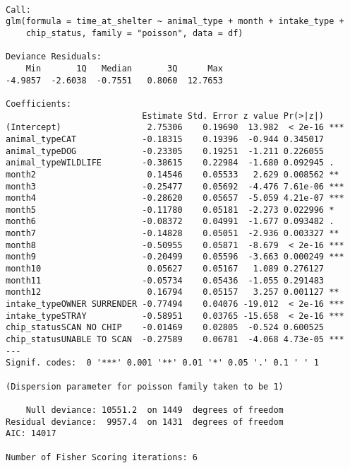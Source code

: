 \documentclass[
]{article}
\begin{document}
\begin{verbatim}

Call:
glm(formula = time_at_shelter ~ animal_type + month + intake_type + 
    chip_status, family = "poisson", data = df)

Deviance Residuals: 
    Min       1Q   Median       3Q      Max  
-4.9857  -2.6038  -0.7551   0.8060  12.7653  

Coefficients:
                           Estimate Std. Error z value Pr(>|z|)    
(Intercept)                 2.75306    0.19690  13.982  < 2e-16 ***
animal_typeCAT             -0.18315    0.19396  -0.944 0.345017    
animal_typeDOG             -0.23305    0.19251  -1.211 0.226055    
animal_typeWILDLIFE        -0.38615    0.22984  -1.680 0.092945 .  
month2                      0.14546    0.05533   2.629 0.008562 ** 
month3                     -0.25477    0.05692  -4.476 7.61e-06 ***
month4                     -0.28620    0.05657  -5.059 4.21e-07 ***
month5                     -0.11780    0.05181  -2.273 0.022996 *  
month6                     -0.08372    0.04991  -1.677 0.093482 .  
month7                     -0.14828    0.05051  -2.936 0.003327 ** 
month8                     -0.50955    0.05871  -8.679  < 2e-16 ***
month9                     -0.20499    0.05596  -3.663 0.000249 ***
month10                     0.05627    0.05167   1.089 0.276127    
month11                    -0.05734    0.05436  -1.055 0.291483    
month12                     0.16794    0.05157   3.257 0.001127 ** 
intake_typeOWNER SURRENDER -0.77494    0.04076 -19.012  < 2e-16 ***
intake_typeSTRAY           -0.58951    0.03765 -15.658  < 2e-16 ***
chip_statusSCAN NO CHIP    -0.01469    0.02805  -0.524 0.600525    
chip_statusUNABLE TO SCAN  -0.27589    0.06781  -4.068 4.73e-05 ***
---
Signif. codes:  0 '***' 0.001 '**' 0.01 '*' 0.05 '.' 0.1 ' ' 1

(Dispersion parameter for poisson family taken to be 1)

    Null deviance: 10551.2  on 1449  degrees of freedom
Residual deviance:  9957.4  on 1431  degrees of freedom
AIC: 14017

Number of Fisher Scoring iterations: 6
\end{verbatim}
\end{document}
